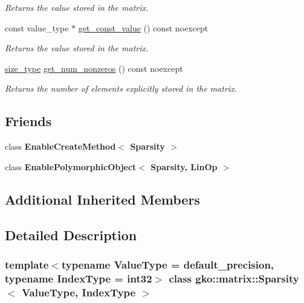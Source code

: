 \begin{DoxyCompactItemize}
\begin{DoxyCompactList}\small\item\em Returns the value stored in the matrix. \end{DoxyCompactList}\item 
const value\+\_\+type $\ast$ \hyperlink{classgko_1_1matrix_1_1Sparsity_a9314f4505be2d592b40527cd63ea4c08}{get\+\_\+const\+\_\+value} () const noexcept
\begin{DoxyCompactList}\small\item\em Returns the value stored in the matrix. \end{DoxyCompactList}\item 
\hyperlink{namespacegko_a6e5c95df0ae4e47aab2f604a22d98ee7}{size\+\_\+type} \hyperlink{classgko_1_1matrix_1_1Sparsity_a72d5dd5f1860ac6d312ef7f0f68c403f}{get\+\_\+num\+\_\+nonzeros} () const noexcept
\begin{DoxyCompactList}\small\item\em Returns the number of elements explicitly stored in the matrix. \end{DoxyCompactList}\end{DoxyCompactItemize}
\subsection*{Friends}
\begin{DoxyCompactItemize}
\item 
\mbox{\label{classgko_1_1matrix_1_1Sparsity_ab1e757c1defbb5666eb911e188a05aee}} 
class {\bfseries Enable\+Create\+Method$<$ Sparsity $>$}
\item 
\mbox{\label{classgko_1_1matrix_1_1Sparsity_a8735a8e27517fea026c73300d695f1fe}} 
class {\bfseries Enable\+Polymorphic\+Object$<$ Sparsity, Lin\+Op $>$}
\end{DoxyCompactItemize}
\subsection*{Additional Inherited Members}


\subsection{Detailed Description}
\subsubsection*{template$<$typename Value\+Type = default\+\_\+precision, typename Index\+Type = int32$>$\newline
class gko\+::matrix\+::\+Sparsity$<$ Value\+Type, Index\+Type $>$}

